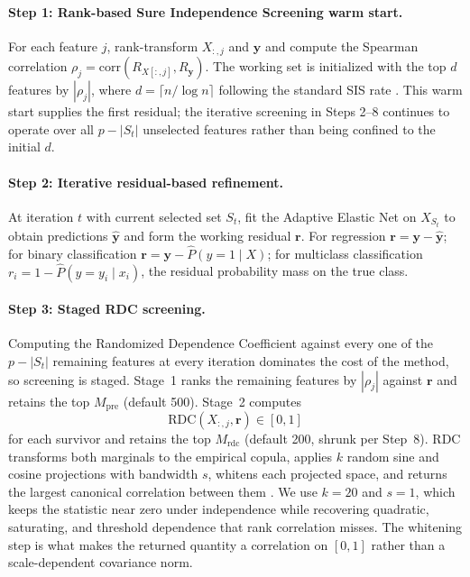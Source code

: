 \documentclass[11pt]{article}
\begin{document}
\paragraph{Step 1: Rank-based Sure Independence Screening warm start.} For each feature $j$,
rank-transform $X_{:,j}$ and $\mathbf{y}$ and compute the Spearman correlation
$\rho_j = \mathrm{corr}(R_{X[:,j]}, R_{\mathbf{y}})$. The working set is initialized with the top $d$
features by $|\rho_j|$, where $d = \lceil n / \log n \rceil$ following the standard SIS rate
\citep{fan2008}. This warm start supplies the first residual; the iterative screening in Steps 2--8
continues to operate over all $p - |S_t|$ unselected features rather than being confined to the
initial $d$.

\paragraph{Step 2: Iterative residual-based refinement.} At iteration $t$ with current selected set
$S_t$, fit the Adaptive Elastic Net on $X_{S_t}$ to obtain predictions $\hat{\mathbf{y}}$ and form
the working residual $\mathbf{r}$. For regression $\mathbf{r} = \mathbf{y} - \hat{\mathbf{y}}$; for
binary classification $\mathbf{r} = \mathbf{y} - \hat{P}(y=1 \mid X)$; for multiclass classification
$r_i = 1 - \hat{P}(y = y_i \mid x_i)$, the residual probability mass on the true class.

\paragraph{Step 3: Staged RDC screening.} Computing the Randomized Dependence Coefficient against
every one of the $p - |S_t|$ remaining features at every iteration dominates the cost of the method,
so screening is staged. Stage~1 ranks the remaining features by $|\rho_j|$ against $\mathbf{r}$ and
retains the top $M_{\mathrm{pre}}$ (default 500). Stage~2 computes
\begin{equation}
\mathrm{RDC}(X_{:,j}, \mathbf{r}) \in [0, 1]
\end{equation}
for each survivor and retains the top $M_{\mathrm{rdc}}$ (default 200, shrunk per Step~8). RDC
transforms both marginals to the empirical copula, applies $k$ random sine and cosine projections
with bandwidth $s$, whitens each projected space, and returns the largest canonical correlation
between them \citep{lopezpaz2013}. We use $k = 20$ and $s = 1$, which keeps the statistic near zero
under independence while recovering quadratic, saturating, and threshold dependence that rank
correlation misses. The whitening step is what makes the returned quantity a correlation on $[0,1]$
rather than a scale-dependent covariance norm.
\end{document}
